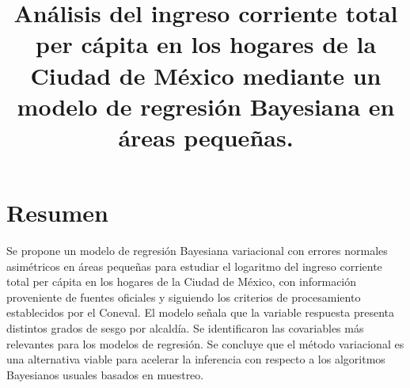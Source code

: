 \documentclass[11pt]{article}
\title{
Análisis del ingreso corriente total per cápita en los hogares de la Ciudad de México mediante un modelo de regresión Bayesiana en áreas pequeñas.
}
\date{}
\author{}
\begin{document}
\allowdisplaybreaks

\maketitle

\section*{Resumen}

Se propone un modelo de regresión Bayesiana variacional con errores normales asimétricos en áreas pequeñas para estudiar el logaritmo del ingreso corriente total per cápita en los hogares de la Ciudad de México, con información proveniente de fuentes oficiales y siguiendo los criterios de procesamiento establecidos por el Coneval. El modelo señala que la variable respuesta presenta distintos grados de sesgo por alcaldía. Se identificaron las covariables más relevantes para los modelos de regresión. Se concluye que el método variacional es una alternativa viable para acelerar la inferencia con respecto a los algoritmos Bayesianos usuales basados en muestreo.
\end{document}
